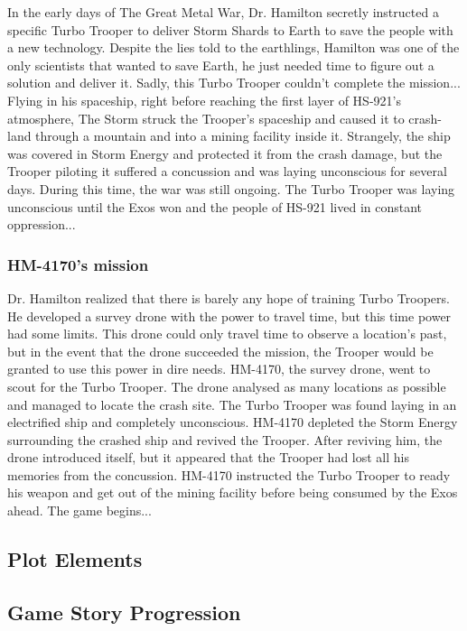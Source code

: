 \documentclass[12pt]{article}
\begin{document}
In the early days of The Great Metal War, Dr. Hamilton secretly instructed a specific Turbo Trooper to deliver Storm Shards to Earth to save the people with a new technology. Despite the lies told to the earthlings, Hamilton was one of the only scientists that wanted to save Earth, he just needed time to figure out a solution and deliver it. Sadly, this Turbo Trooper couldn't complete the mission... Flying in his spaceship, right before reaching the first layer of HS-921's atmosphere, The Storm struck the Trooper's spaceship and caused it to crash-land through a mountain and into a mining facility inside it. Strangely, the ship was covered in Storm Energy and protected it from the crash damage, but the Trooper piloting it suffered a concussion and was laying unconscious for several days. During this time, the war was still ongoing. The Turbo Trooper was laying unconscious until the Exos won and the people of HS-921 lived in constant oppression...

\subsubsection{HM-4170's mission}

Dr. Hamilton realized that there is barely any hope of training Turbo Troopers. He developed a survey drone with the power to travel time, but this time power had some limits. This drone could only travel time to observe a location's past, but in the event that the drone succeeded the mission, the Trooper would be granted to use this power in dire needs. HM-4170, the survey drone, went to scout for the Turbo Trooper. The drone analysed as many locations as possible and managed to locate the crash site. The Turbo Trooper was found laying in an electrified ship and completely unconscious. HM-4170 depleted the Storm Energy surrounding the crashed ship and revived the Trooper. After reviving him, the drone introduced itself, but it appeared that the Trooper had lost all his memories from the concussion. HM-4170 instructed the Turbo Trooper to ready his weapon and get out of the mining facility before being consumed by the Exos ahead. The game begins... 

\subsection{Plot Elements}

\subsection{Game Story Progression}
\end{document}
